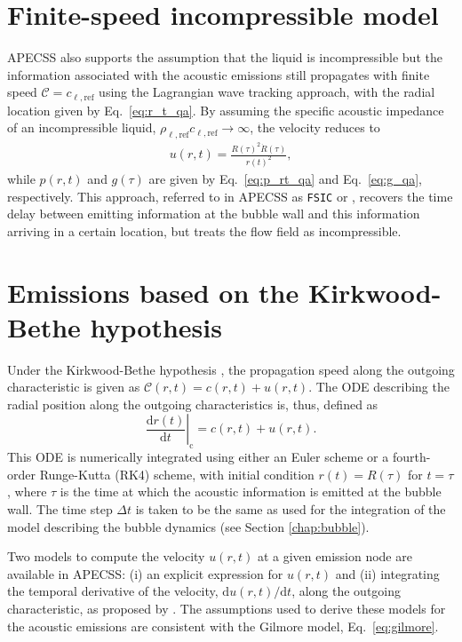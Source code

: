 \section{Finite-speed incompressible model}
\label{sec:emissionsfsic}

APECSS also supports the assumption that the liquid is incompressible but the information associated with the acoustic emissions still propagates with finite speed $\mathcal{C} = c_{\ell,\mathrm{ref}}$ using the Lagrangian wave tracking approach, with the radial location given by Eq.~\eqref{eq:r_t_qa}.
By assuming the specific acoustic impedance of an incompressible liquid, $\rho_{\ell,\mathrm{ref}} c_{\ell,\mathrm{ref}} \rightarrow \infty$, the velocity reduces to
\begin{align}
    u(r,t) = \frac{R(\tau)^2 \dot{R}(\tau)}{r(t)^2}, \label{eq:u_rt_fsic} 
\end{align}
while $p(r,t)$ and $g(\tau)$ are given by Eq.~\eqref{eq:p_rt_qa} and Eq.~\eqref{eq:g_qa}, respectively.
This approach, referred to in APECSS as {\tt FSIC} or , recovers the time delay between emitting information at the bubble wall and this information arriving in a certain location, but treats the flow field as incompressible.

\section{Emissions based on the Kirkwood-Bethe hypothesis}
\label{sec:emissionskb}

Under the Kirkwood-Bethe hypothesis \citep{Kirkwood1942,Cole1948}, the propagation speed along the outgoing characteristic is given as $\mathcal{C}(r,t) = c(r,t) + u(r,t)$. The ODE describing the radial position along the outgoing characteristics is, thus, defined as 
\begin{equation}
    \left. \frac{\mathrm{d}r(t)}{\mathrm{d}t} \right|_\text{c} = c(r,t) + u(r,t). \label{eq:drdt}
\end{equation}
This ODE is numerically integrated using either an Euler scheme or a fourth-order Runge-Kutta (RK4) scheme, with initial condition $r(t) = R(\tau)$ for $t=\tau$, where $\tau$ is the time at which the acoustic information is emitted at the bubble wall. The time step $\Delta t$ is taken to be the same as used for the integration of the model describing the bubble dynamics (see Section \ref{chap:bubble}).

Two models to compute the velocity $u(r,t)$ at a given emission node are available in APECSS: (i) an explicit expression for $u(r,t)$ \citep{Denner2023}  and (ii) integrating the temporal derivative of the velocity, $\mathrm{d}u(r,t)/\mathrm{d}t$, along the outgoing characteristic, as proposed by \citet{Hickling1963}. The assumptions used to derive these models for the acoustic emissions are consistent with the Gilmore model, Eq.~\eqref{eq:gilmore}.

